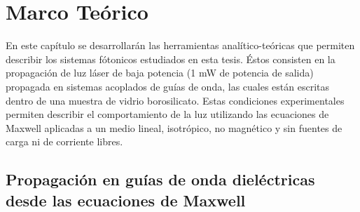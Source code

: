 \chapter{Marco Teórico}

En este capítulo se desarrollarán las herramientas analítico-teóricas que permiten describir los sistemas fótonicos estudiados en esta tesis. Éstos consisten en la propagación de luz láser de baja potencia (1 mW de potencia de salida) propagada en sistemas acoplados de guías de onda, las cuales están escritas dentro de una muestra de vidrio borosilicato. Estas condiciones experimentales permiten describir el comportamiento de la luz utilizando las ecuaciones de Maxwell aplicadas a un medio lineal, isotrópico, no magnético y sin fuentes de carga ni de corriente libres. 
\section{Propagación en guías de onda dieléctricas desde las ecuaciones de Maxwell \label{cap:maxwell}}

